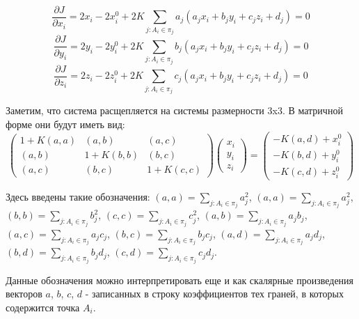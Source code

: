 \documentclass[a4paper,12pt, titlepage]{article}
\begin{document}
\begin{flushleft}
$$
  \frac{\partial J}{\partial x_{i}} = 2 x_{i} - 2 x_{i}^{0} + 
  2 K \sum\limits_{j: A_{i} \in \pi_{j}}
  a_{j} (a_{j}x_{i} + b_{j}y_{i} + c_{j}z_{i} + d_{j}) = 0
$$
$$
  \frac{\partial J}{\partial y_{i}} = 2 y_{i} - 2 y_{i}^{0} + 
  2 K \sum\limits_{j: A_{i} \in \pi_{j}}
  b_{j} (a_{j}x_{i} + b_{j}y_{i} + c_{j}z_{i} + d_{j}) = 0
$$
$$
  \frac{\partial J}{\partial z_{i}} = 2 z_{i} - 2 z_{i}^{0} + 
  2 K \sum\limits_{j: A_{i} \in \pi_{j}}
  c_{j} (a_{j}x_{i} + b_{j}y_{i} + c_{j}z_{i} + d_{j}) = 0
$$
\end{flushleft}
\begin{flushleft}
 Заметим, что система расщепляется на системы размерности 3x3. В матричной форме они будут иметь
вид:
$$
  \begin{pmatrix}
    1 + K (a, a) & (a, b) & (a, c)\\
    (a, b) & 1 + K (b, b) & (b, c)\\
    (a, c) & (b, c) & 1 + K (c, c)
  \end{pmatrix}
  \begin{pmatrix}
    x_{i}\\
    y_{i}\\
    z_{i}
  \end{pmatrix} = 
  \begin{pmatrix}
    -K (a, d) + x_{i}^{0}\\
    -K (b, d) + y_{i}^{0}\\
    -K (c, d) + z_{i}^{0}
  \end{pmatrix}
$$
\end{flushleft}
\begin{flushleft}
 Здесь введены такие обозначения: $(a, a) = \sum\limits_{j: A_{i} \in \pi_{j}}a_{j}^{2}$,
$(a, a) = \sum\limits_{j: A_{i} \in \pi_{j}}a_{j}^{2}$,
$(b, b) = \sum\limits_{j: A_{i} \in \pi_{j}}b_{j}^{2}$,
$(c, c) = \sum\limits_{j: A_{i} \in \pi_{j}}c_{j}^{2}$,
$(a, b) = \sum\limits_{j: A_{i} \in \pi_{j}}a_{j}b_{j}$,
$(a, c) = \sum\limits_{j: A_{i} \in \pi_{j}}a_{j}c_{j}$,
$(b, c) = \sum\limits_{j: A_{i} \in \pi_{j}}b_{j}c_{j}$,
$(a, d) = \sum\limits_{j: A_{i} \in \pi_{j}}a_{j}d_{j}$,
$(b, d) = \sum\limits_{j: A_{i} \in \pi_{j}}b_{j}d_{j}$,
$(c, d) = \sum\limits_{j: A_{i} \in \pi_{j}}c_{j}d_{j}$.
\end{flushleft}

\begin{flushleft}
 Данные обозначения можно интерпретировать еще и как скалярные произведения векторов $a$, 
$b$, $c$, $d$ - записанных в строку коэффициентов тех граней, в которых содержится точка $A_{i}$.
\end{flushleft}
\end{document}
